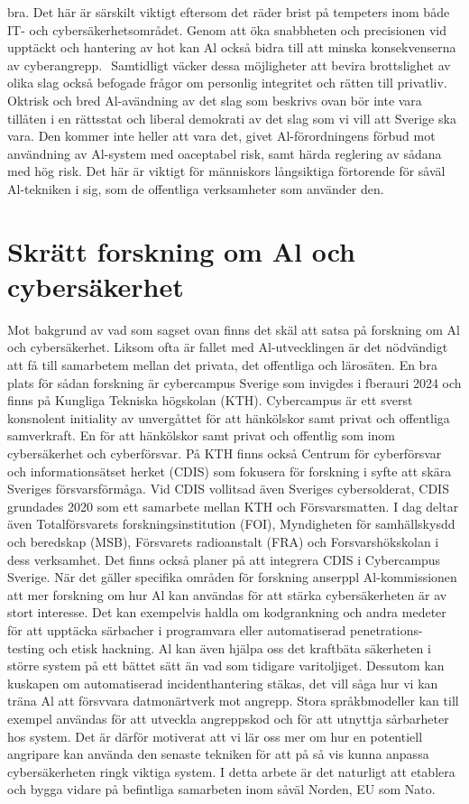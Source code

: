 {{{{{{{{bra. Det här är särskilt viktigt eftersom det räder brist på tempeters inom både IT- och cybersäkerhetsområdet. Genom att öka snabbheten och precisionen vid upptäckt och hantering av hot kan Al också bidra till att minska konsekvenserna av cyberangrepp. \({ }^{}\)
Samtidligt väcker dessa möjligheter att bevira brottslighet av olika slag också befogade frågor om personlig integritet och rätten till privatliv. Oktrisk och bred Al-avändning av det slag som beskrivs ovan bör inte vara tillåten i en rättsstat och liberal demokrati av det slag som vi vill att Sverige ska vara. Den kommer inte heller att vara det, givet Al-förordningens förbud mot användning av Al-system med oaceptabel risk, samt härda reglering av sådana med hög risk. Det här är viktigt för människors långsiktiga förtorende för såväl Al-tekniken i sig, som de offentliga verksamheter som använder den. \({ }^{}\)
\section*{Skrätt forskning om Al och cybersäkerhet}
Mot bakgrund av vad som sagset ovan finns det skäl att satsa på forskning om Al och cybersäkerhet. Liksom ofta är fallet med Al-utvecklingen är det nödvändigt att få till samarbetem mellan det privata, det offentliga och lärosäten. En bra plats för sådan forskning är cybercampus Sverige som invigdes i fberauri 2024 och finns på Kungliga Tekniska högskolan (KTH). Cybercampus är ett sverst konsnolent initiality av unvergåttet för att hänkölskor samt privat och offentliga samverkraft. En för att hänkölskor samt privat och offentlig som inom cybersäkerhet och cyberförsvar. På KTH finns också Centrum för cyberförsvar och informationsätset herket (CDIS) som fokusera för forskning i syfte att skära Sveriges försvarsförmåga. Vid CDIS vollitsad även Sveriges cybersolderat, CDIS grundades 2020 som ett samarbete mellan KTH och Försvarsmatten. I dag deltar även Totalförsvarets forskningsinstitution (FOI), Myndigheten för samhällskysdd och beredskap (MSB), Försvarets radioanstalt (FRA) och Forsvarshökskolan i dess verksamhet. Det finns också planer på att integrera CDIS i Cybercampus Sverige.
När det gäller specifika områden för forskning anserppl Al-kommissionen att mer forskning om hur Al kan användas för att stärka cybersäkerheten är av stort interesse. Det kan exempelvis haldla om kodgrankning och andra medeter för att upptäcka särbacher i programvara eller automatiserad penetrations-
testing och etisk hackning. Al kan även hjälpa oss det kraftbäta säkerheten i större system på ett bättet sätt än vad som tidigare varitoljiget. Dessutom kan kuskapen om automatiserad incidenthantering stäkas, det vill såga hur vi kan träna Al att försvvara datmonärtverk mot angrepp. Stora språkbmodeller kan
till exempel användas för att utveckla angreppskod och för att utnyttja sårbarheter hos system. Det är därför motiverat att vi lär oss mer om hur en potentiell angripare kan använda den senaste tekniken för att på så vis kunna anpassa cybersäkerheten ringk viktiga system. I detta arbete är det naturligt att etablera och bygga vidare på befintliga samarbeten inom såväl Norden, EU som Nato.
}}}}}}}}
